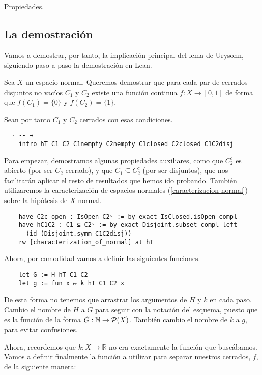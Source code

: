 Propiedades.

\subsection{La demostración}

Vamos a demostrar, por tanto, la implicación principal del lema de Urysohn, siguiendo paso a paso la demostración en Lean.

Sea $X$ un espacio normal. Queremos demostrar que para cada par de cerrados disjuntos no vacíos $C_1$ y $C_2$  existe una función continua $f : X \to [0, 1]$ de forma que $f(C_1) = \{0\}$ y $f(C_2) = \{1\}$.

Sean por tanto $C_1$ y $C_2$ cerrados con esas condiciones.

\begin{lstlisting}
  · -- →
    intro hT C1 C2 C1nempty C2nempty C1closed C2closed C1C2disj
\end{lstlisting}

Para empezar, demostramos algunas propiedades auxiliares, como que $C_2^c$ es abierto (por ser $C_2$ cerrado), y que $C_1 \subseteq C_2^c$ (por ser disjuntos), que nos facilitarán aplicar el resto de resultados que hemos ido probando. También utilizaremos la caracterización de espacios normales (\ref{caracterizacion-normal}) sobre la hipótesis de $X$ normal.

\begin{lstlisting}
    have C2c_open : IsOpen C2ᶜ := by exact IsClosed.isOpen_compl
    have hC1C2 : C1 ⊆ C2ᶜ := by exact Disjoint.subset_compl_left
      (id (Disjoint.symm C1C2disj))
    rw [characterization_of_normal] at hT
\end{lstlisting}

Ahora, por comodidad vamos a definir las siguientes funciones.

\begin{lstlisting}
    let G := H hT C1 C2
    let g := fun x ↦ k hT C1 C2 x
\end{lstlisting}

De esta forma no tenemos que arrastrar los argumentos de $H$ y $k$ en cada paso. Cambio el nombre de $H$ a $G$ para seguir con la notación del esquema, puesto que es la función de la forma $G : \mathbb{N} \to \mathcal{P}(X)$. También cambio el nombre de $k$ a $g$, para evitar confusiones.

Ahora, recordemos que $k : X \to \mathbb{R}$ no era exactamente la función que buscábamos. Vamos a definir finalmente la función a utilizar para separar nuestros cerrados, $f$, de la siguiente manera:

